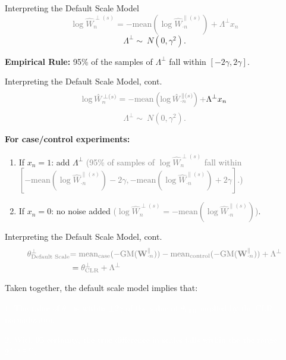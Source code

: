 \documentclass[
  ignorenonframetext,
]{beamer}
\begin{document}
\begin{frame}{Interpreting the Default Scale Model}
\protect\hypertarget{interpreting-the-default-scale-model}{}
\textcolor{gray}{$$\log \hat{W}_{n}^{\perp(s)} = - \mathrm{mean} \left(\log \hat{W}^{\parallel (s)}_{\cdot n}\right) + \Lambda^\perp x_{n}$$}
\[\Lambda^\perp  \sim \ N(0, \gamma^2).\] \vspace{.1in}

\textbf{Empirical Rule:} 95\% of the samples of \(\Lambda^\perp\) fall
within \([-2 \gamma, 2 \gamma]\).
\end{frame}

\begin{frame}{Interpreting the Default Scale Model, cont.}
\protect\hypertarget{interpreting-the-default-scale-model-cont.}{}
\[\textcolor{gray}{\log \hat{W}_{n}^{\perp(s)} = - \mathrm{mean} \left(\log \hat{W}^{\parallel (s)}_{\cdot n}\right) +} \Lambda^\perp x_{n}\]
\textcolor{gray}{$$\Lambda^\perp  \sim \ N(0, \gamma^2).$$}

\vspace{.1in}

\textbf{For case/control experiments:}

\begin{enumerate}
\item
  If \(x_n = 1\): add \(\Lambda^\perp\)
  \textcolor{gray}{(95\% of samples of $\log \hat{W}_{n}^{\perp(s)}$ fall within $[- \mathrm{mean} \left(\log \hat{W}^{\parallel (s)}_{\cdot n}\right) - 2 \gamma, - \mathrm{mean} \left(\log \hat{W}^{\parallel (s)}_{\cdot n}\right) + 2 \gamma]$.)}
\item
  If \(x_n = 0\): no noise added
  \textcolor{gray}{($\log \hat{W}_{n}^{\perp(s)} = - \mathrm{mean} \left(\log \hat{W}^{\parallel (s)}_{\cdot n}\right)$)}.
\end{enumerate}
\end{frame}

\begin{frame}{Interpreting the Default Scale Model, cont.}
\protect\hypertarget{interpreting-the-default-scale-model-cont.-1}{}
\begin{align*}
\textcolor{gray}{\theta^\perp_{\text{Default Scale}}} &\textcolor{gray}{= \text{mean}_{\text{case}}(-\text{GM}( \mathbf{W}_{\cdot n}^\parallel)) - \text{mean}_{\text{control}}(-\text{GM}( \mathbf{W}_{\cdot n}^\parallel)) + \Lambda^\perp}\\
&= \textcolor{gray}{\theta^\perp_{\text{CLR}} + \Lambda^\perp}
\end{align*}

Taken together, the default scale model implies that:

\vspace{.1in}

\textcolor{white}{1. The value of $\theta^\perp$ is within $\pm 2 \gamma$ of the value of $\theta^\perp_{\text{CLR}}$ implied by the CLR normalization.}

\textcolor{white}{2. With 95 certainty, the true difference in scales falls within the the range $2^{\theta_{\text{CLR}}^\perp \pm 2 \gamma}$.}
\end{frame}
\end{document}
